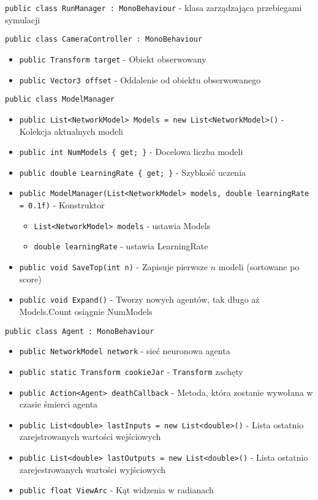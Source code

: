\documentclass[12pt,a4paper]{article}
\begin{document}
\lstinline{public class RunManager : MonoBehaviour} - klasa zarządzająca przebiegami symulacji


\lstinline{public class CameraController : MonoBehaviour}
\begin{itemize}
    \item \lstinline|public Transform target| - Obiekt obserwowany
    \item \lstinline|public Vector3 offset| - Oddalenie od obiektu obserwowanego
\end{itemize}


\lstinline{public class ModelManager}
\begin{itemize}
    \item \lstinline|public List<NetworkModel> Models = new List<NetworkModel>()| - Kolekcja aktualnych modeli
    \item \lstinline|public int NumModels { get; }| - Docelowa liczba modeli
    \item \lstinline|public double LearningRate { get; }| - Szybkość uczenia
    \item \lstinline|public ModelManager(List<NetworkModel> models, double learningRate = 0.1f)| - Konstruktor
          \begin{itemize}
              \item \lstinline{List<NetworkModel> models} - ustawia Models
              \item \lstinline{double learningRate} - ustawia LearningRate
          \end{itemize}
    \item \lstinline|public void SaveTop(int n)| - Zapisuje pierwsze $n$ modeli (sortowane po score)
    \item \lstinline|public void Expand()| - Tworzy nowych agentów, tak długo aż Models.Count osiągnie NumModels
\end{itemize}


\lstinline{public class Agent : MonoBehaviour}
\begin{itemize}
    \item \lstinline|public NetworkModel network| - sieć neuronowa agenta
    \item \lstinline|public static Transform cookieJar| - \lstinline{Transform} zachęty
    \item \lstinline|public Action<Agent> deathCallback| - Metoda, która zostanie wywołana w czasie śmierci agenta
    \item \lstinline|public List<double> lastInputs = new List<double>()| - Lista ostatnio zarejstrowanych wartości wejściowych
    \item \lstinline|public List<double> lastOutputs = new List<double>()| - Lista ostatnio zarejestrowanych wartości wyjściowych
    \item \lstinline|public float ViewArc| - Kąt widzenia w radianach
\end{itemize}
\end{document}
